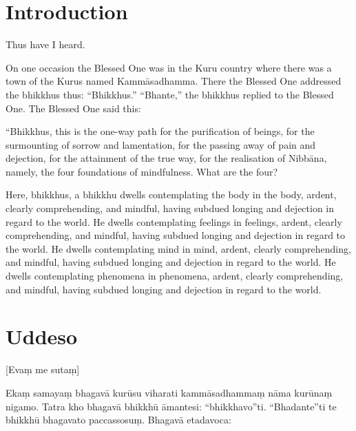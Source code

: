 \newcommand\englishPage{%
  \clearpage%
  \englishText%
}

\newcommand\paliPage{%
  \clearpage%
  \paliText%
}

\renewcommand{\englishTitle}{The Foundations of Mindfulness}
\renewcommand{\paliTitle}{Mahāsatipaṭṭhāna Sutta}

\englishPage
\chapter{Introduction}

Thus have I heard.

On one occasion the Blessed One was in the Kuru country where there was a town
of the Kurus named Kammāsadhamma. There the Blessed One addressed the bhikkhus
thus: “Bhikkhus.” “Bhante,” the bhikkhus replied to the Blessed One. The Blessed
One said this:

“Bhikkhus, this is the one-way path for the purification of beings, for the
surmounting of sorrow and lamentation, for the passing away of pain and
dejection, for the attainment of the true way, for the realisation of Nibbāna,
namely, the four foundations of mindfulness. What are the four?

Here, bhikkhus, a bhikkhu dwells contemplating the body in the body, ardent,
clearly comprehending, and mindful, having subdued longing and dejection in
regard to the world. He dwells contemplating feelings in feelings, ardent,
clearly comprehending, and mindful, having subdued longing and dejection in
regard to the world. He dwells contemplating mind in mind, ardent, clearly
comprehending, and mindful, having subdued longing and dejection in regard to
the world. He dwells contemplating phenomena in phenomena, ardent, clearly
comprehending, and mindful, having subdued longing and dejection in regard to
the world.


\paliPage
\chapter*{Uddeso}

[Evaṃ me sutaṃ]

Ekaṃ samayaṃ bhagavā kurūsu viharati kammāsadhammaṃ nāma kurūnaṃ nigamo. Tatra
kho bhagavā bhikkhū āmantesi: “bhikkhavo”ti. “Bhadante”ti te bhikkhū bhagavato
paccassosuṃ. Bhagavā etadavoca:

